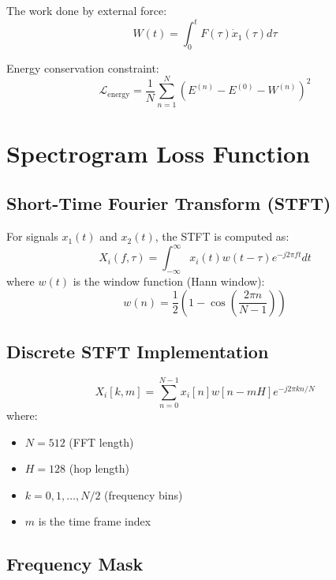\documentclass{article}
\begin{document}
The work done by external force:
\begin{equation}
W(t) = \int_0^t F(\tau) \dot{x}_1(\tau) d\tau
\end{equation}

Energy conservation constraint:
\begin{equation}
\mathcal{L}_{\text{energy}} = \frac{1}{N} \sum_{n=1}^{N} \left( E^{(n)} - E^{(0)} - W^{(n)} \right)^2
\end{equation}

\section{Spectrogram Loss Function}

\subsection{Short-Time Fourier Transform (STFT)}

For signals $x_1(t)$ and $x_2(t)$, the STFT is computed as:
\begin{equation}
X_i(f, \tau) = \int_{-\infty}^{\infty} x_i(t) w(t - \tau) e^{-j2\pi ft} dt
\end{equation}
where $w(t)$ is the window function (Hann window):
\begin{equation}
w(n) = \frac{1}{2}\left(1 - \cos\left(\frac{2\pi n}{N-1}\right)\right)
\end{equation}

\subsection{Discrete STFT Implementation}

\begin{equation}
X_i[k, m] = \sum_{n=0}^{N-1} x_i[n] w[n - mH] e^{-j2\pi kn/N}
\end{equation}
where:
\begin{itemize}
\item $N = 512$ (FFT length)
\item $H = 128$ (hop length)
\item $k = 0, 1, \ldots, N/2$ (frequency bins)
\item $m$ is the time frame index
\end{itemize}

\subsection{Frequency Mask}
\end{document}
